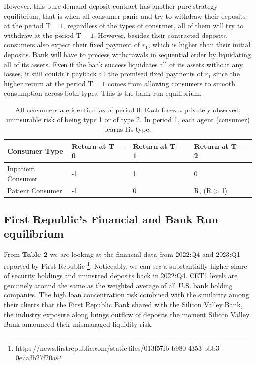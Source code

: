 \documentclass[a4paper]{article}
\begin{document}
However, this pure demand deposit contract has another pure strategy equilibrium, that is when all consumer panic and try to withdraw their deposits at the period $\textrm{T} = 1$, regardless of the types of consumer, all of them will try to withdraw at the period $\textrm{T} = 1$. However, besides their contracted deposits, consumers also expect their fixed payment of $r_{1}$, which is higher than their initial deposits. Bank will have to process withdrawals in sequential order by liquidating all of its assets. Even if the bank success liquidates all of its assets without any losses, it still couldn't payback all the promised fixed payments of $r_{1}$ since the higher return at the period $\textrm{T} = 1$ comes from allowing consumers to smooth consumption across both types. This is the bank-run equilibrium. 

\begin{table}[]
    \centering
    \begin{tabular}{|p{3cm}||p{3cm}||p{3cm}|p{3cm}|}
        \hline
        \textrm{Consumer Type}& \textrm{Return at T = 0}& \textrm{Return at T = 1}& \textrm{Return at T = 2}\\
        \hline
        Inpatient Consumer & -1 & 1 & 0\\
        Patient Consumer & -1 & 0 & R, (R > 1)\\
        \hline   
    \end{tabular}
    \caption{All consumers are identical as of period 0. Each faces a privately observed, uninsurable risk of being type 1 or of type 2. In period 1, each agent (consumer) learns his type.}
    \label{tab:my_label}
\end{table}

\subsection{First Republic's Financial and Bank Run equilibrium}\label{FRC Financial}
\vspace{-0.25cm}

\quad \quad From \textbf{Table 2} we are looking at the financial data from 2022:Q4 and 2023:Q1 reported by First Republic \footnote{https://news.firstrepublic.com/static-files/013f57fb-b980-4353-bbb3-0e7a3b27f20a}. Noticeably, we can see a substantially higher share of security holdings and uninsured deposits back in 2022:Q4. CET1 levels are genuinely around the same as the weighted average of all U.S. bank holding companies. The high loan concentration risk combined with the similarity among their clients that the First Republic Bank shared with the Silicon Valley Bank, the industry exposure along brings outflow of deposits the moment Silicon Valley Bank announced their mismanaged liquidity risk. 
\end{document}

